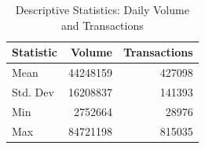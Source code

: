 \begin{table}[ht]
\centering
\begin{tabular}{lrr}
  \hline
Statistic & Volume & Transactions \\ 
  \hline
Mean & 44248159 & 427098 \\ 
  Std. Dev & 16208837 & 141393 \\ 
  Min & 2752664 & 28976 \\ 
  Max & 84721198 & 815035 \\ 
   \hline
\end{tabular}
\caption{Descriptive Statistics: Daily Volume and Transactions} 
\label{tab:activity}
\end{table}
